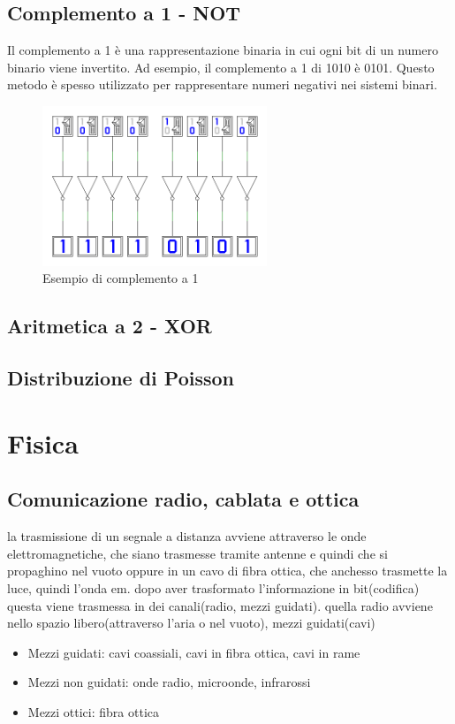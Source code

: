 \subsection{Complemento a 1 - NOT}
Il complemento a 1  è una rappresentazione binaria in cui ogni bit di un numero binario viene invertito. Ad esempio, il complemento a 1 di 1010 è 0101. Questo metodo è spesso utilizzato per rappresentare numeri negativi nei sistemi binari.
\begin{figure}[h!]
    \centering
    \includegraphics[width=0.6\textwidth]{images/complemento_uno}
    \caption{Esempio di complemento a 1}
    \label{fig:complemento_uno}
\end{figure}
\subsection{Aritmetica a 2 - XOR}
\subsection{Distribuzione di Poisson}
\newpage
\section{Fisica}
\subsection{Comunicazione radio, cablata e ottica}
la trasmissione di un segnale a distanza avviene attraverso le onde elettromagnetiche, che siano trasmesse tramite antenne e quindi che si propaghino nel vuoto oppure in un cavo di fibra ottica, che anchesso trasmette la luce, quindi l’onda em.
dopo aver trasformato l'informazione in bit(codifica) questa viene trasmessa in dei canali(radio, mezzi guidati). quella radio avviene nello spazio libero(attraverso l’aria o nel vuoto), mezzi guidati(cavi)
\begin{itemize}
    \item Mezzi guidati: cavi coassiali, cavi in fibra ottica, cavi in rame
    \item Mezzi non guidati: onde radio, microonde, infrarossi
    \item Mezzi ottici: fibra ottica
\end{itemize}
